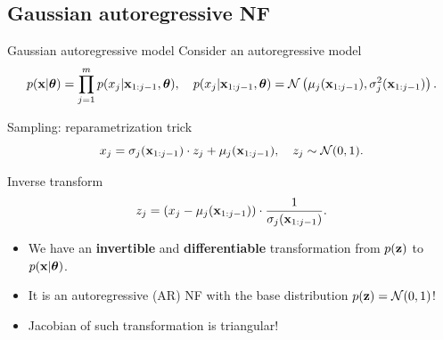 \subsection{Gaussian autoregressive NF}
\begin{frame}{Gaussian autoregressive model}
	Consider an autoregressive model
	\vspace{-0.3cm}
	{\small
		\[
		p(\mathbf{x} | \boldsymbol{\theta}) = \prod_{j=1}^m p(x_j | \mathbf{x}_{1:j - 1}, \boldsymbol{\theta}), \quad
		p(x_j | \mathbf{x}_{1:j - 1}, \boldsymbol{\theta}) = \mathcal{N} \left(\mu_j(\mathbf{x}_{1:j-1}), \sigma^2_j (\mathbf{x}_{1:j-1})\right).
		\]
	}
	\vspace{-0.5cm}
	\begin{block}{Sampling: reparametrization trick}
		\vspace{-0.3cm}
		\[
		x_j = \sigma_j (\mathbf{x}_{1:j-1}) \cdot z_j + \mu_j(\mathbf{x}_{1:j-1}), \quad z_j \sim \mathcal{N}(0, 1).
		\]
		\vspace{-0.7cm}
	\end{block}
	\begin{block}{Inverse transform}
		\vspace{-0.3cm}
		\[
		z_j = \left(x_j - \mu_j(\mathbf{x}_{1:j-1}) \right) \cdot \frac{1}{\sigma_j (\mathbf{x}_{1:j-1}) }.
		\]
		\vspace{-0.4cm}
	\end{block}
	\begin{itemize}
		\item We have an \textbf{invertible} and \textbf{differentiable} transformation from $p(\mathbf{z})$ to $p(\mathbf{x} | \boldsymbol{\theta})$.
		\item It is an autoregressive (AR) NF with the base distribution $p(\mathbf{z}) = \mathcal{N}(0, 1)$!
		\item Jacobian of such transformation is triangular!
	\end{itemize}
\end{frame}
